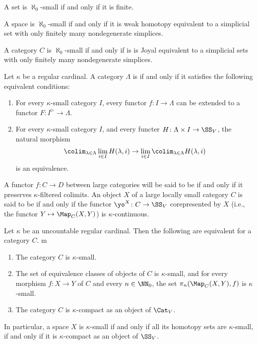 \begin{eg}
	A set is $ \aleph_0 $-small if and only if it is finite.

	A space is $ \aleph_0 $-small if and only if it is weak homotopy equivalent to a simplicial set with only finitely many nondegenerate simplices.

	A category $ C $ is $ \aleph_0 $-small if and only if is is Joyal equivalent to a simplicial sets with only finitely many nondegenerate simplices. 
\end{eg}

\begin{definition}
	Let $ \kappa $ be a regular cardinal.
	A category $ \Lambda $ is  if and only if it satisfies the following equivalent conditions:
	\begin{enumerate}
		\item For every $ \kappa $-small category $ I $,
			every functor $ f \colon I \to \Lambda $ can be extended to a functor $ F \colon I^{\rhd} \to \Lambda $.
		\item For every $ \kappa $-small category $ I $, and every functer $ H \colon \Lambda \times I \to \SS_V$,
			the natural morphism
			\[
				\colim_{\lambda \in \Lambda} \lim_{i \in I} H(\lambda,i) \to \lim_{i \in I} \colim_{\lambda \in \Lambda} H(\lambda,i)
			\]
			is an equivalence.
	\end{enumerate}
	
	A functor $ f \colon C \to D $ between large categories will be said to be  if and only if it preserves $ \kappa $-filtered colimits.
	An object $ X $ of a large locally small category $ C $ is said to be  if and only if the functor $ \yo^X \colon C \to \SS_V$ corepresented by $ X $ (i.e., the functor $ Y \mapsto \Map_C(X,Y) $) is $ \kappa $-continuous.
\end{definition}

\begin{eg}
	Let $ \kappa $ be an uncountable regular cardinal.
	Then the following are equivalent for a category $ C $.
	m\begin{enumerate}
		\item The category $ C $ is $ \kappa $-small.
		\item The set of equivalence classes of objects of $C$ is $ \kappa $-small,
			and for every morphism $ f \colon X \to Y $ of $ C $ and every $ n \in \NN_0$, the set $ \pi_n(\Map_C(X,Y),f) $ is $ \kappa $-small.
		\item The category $ C $ is $ \kappa $-compact as an object of $ \Cat_V $.
	\end{enumerate}
	In particular, a space $ X $ is $ \kappa $-small if and only if all its homotopy sets are $ \kappa $-small, if and only if it is $ \kappa $-compact as an object of $ \SS_V $.
\end{eg}

